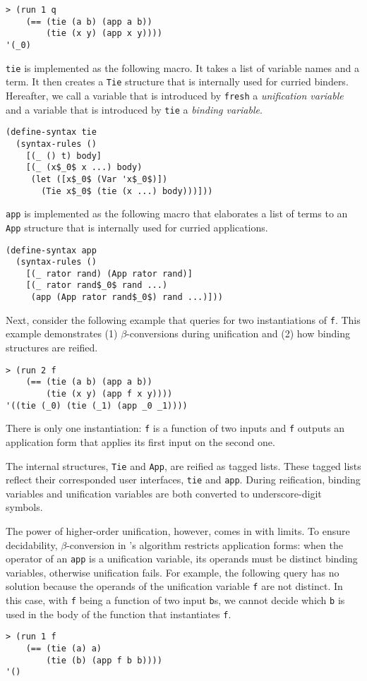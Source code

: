 \documentclass[acmlarge,review]{acmart}
\theoremstyle{definition}
\begin{document}
\begin{lstlisting}
> (run 1 q
    (== (tie (a b) (app a b))
        (tie (x y) (app x y))))
'(_0)
\end{lstlisting}


\texttt{tie} is implemented as the following macro. It takes a list of variable
names and a term. It then creates a \texttt{Tie} structure that is internally
used for curried binders. Hereafter, we call a variable that is introduced
by \texttt{fresh} a \emph{unification variable} and a variable that is
introduced by \texttt{tie} a \emph{binding variable}.

\begin{lstlisting}
(define-syntax tie
  (syntax-rules ()
    [(_ () t) body]
    [(_ (x$_0$ x ...) body)
     (let ([x$_0$ (Var 'x$_0$)])
       (Tie x$_0$ (tie (x ...) body)))]))
\end{lstlisting}

\texttt{app} is implemented as the following macro that elaborates a list of
terms to an \texttt{App} structure that is internally used for curried
applications.

\begin{lstlisting}
(define-syntax app
  (syntax-rules ()
    [(_ rator rand) (App rator rand)]
    [(_ rator rand$_0$ rand ...)
     (app (App rator rand$_0$) rand ...)]))
\end{lstlisting}

Next, consider the following example that queries for two instantiations
of \texttt{f}. This example demonstrates (1) $\beta$-conversions during
unification and (2) how binding structures are reified.

\begin{lstlisting}
> (run 2 f
    (== (tie (a b) (app a b))
        (tie (x y) (app f x y))))
'((tie (_0) (tie (_1) (app _0 _1))))
\end{lstlisting}

There is only one instantiation: \texttt{f} is a function of two inputs and
\texttt{f} outputs an application form that applies its first input on the
second one.

The internal structures, \texttt{Tie} and \texttt{App}, are reified as
tagged lists. These tagged lists reflect their corresponded user interfaces,
\texttt{tie} and \texttt{app}. During reification, binding variables and
unification variables are both converted to underscore-digit symbols.

The power of higher-order unification, however, comes in with limits.
To ensure decidability, $\beta$-conversion in
\citet{miller_logic_1991}'s algorithm restricts application forms:
when the operator of an \texttt{app} is a unification variable, its operands
must be distinct binding variables, otherwise unification fails.
For example, the following query has no solution because the operands of
the unification variable \texttt{f} are not distinct. In this case, with
\texttt{f} being a function of two input \texttt{b}s, we cannot decide which
\texttt{b} is used in the body of the function that instantiates \texttt{f}.
\begin{lstlisting}
> (run 1 f
    (== (tie (a) a)
        (tie (b) (app f b b))))
'()
\end{lstlisting}
\end{document}
